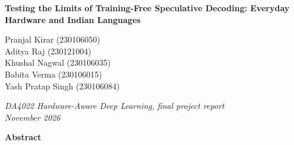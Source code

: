 \documentclass[11pt,a4paper]{article}
\begin{document}
\begin{titlepage}
\centering
\vspace*{1.2cm}
{\LARGE\bfseries Testing the Limits of Training-Free Speculative Decoding: Everyday Hardware and Indian Languages\par}
\vspace{1cm}
{\large Pranjal Kirar (230106050) \\[3pt]
Aditya Raj (230121004) \\[3pt]
Khushal Nagwal (230106035) \\[3pt]
Babita Verma (230106015) \\[3pt]
Yash Pratap Singh (230106084)\par}
\vspace{0.8cm}
{\itshape DA4022 Hardware-Aware Deep Learning, final project report\\[2pt] November 2026\par}
\vspace{1.2cm}
\begin{minipage}{0.86\linewidth}
\small
\begin{center}\textbf{Abstract}\end{center}
\vspace{-4pt}

\end{minipage}
\end{titlepage}
\end{document}
